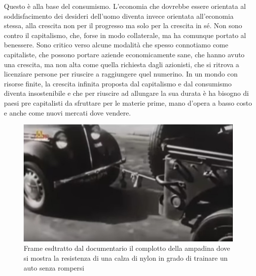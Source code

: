 \documentclass[12pt]{book} %
\begin{document}
Questo è alla base del consumismo. L'economia che dovrebbe essere orientata al soddisfacimento dei
desideri dell'uomo diventa invece orientata all'economia stessa, alla
crescita non per il progresso ma solo per la crescita in sé. Non sono contro il capitalismo, che, forse in modo collaterale, ma ha comunque portato al benessere. Sono critico verso alcune modalità che spesso connotiamo come capitaliste, che possono portare aziende economicamente sane, che hanno avuto una crescita, ma non alta come quella richiesta dagli azionisti, che si ritrova a licenziare persone per riuscire a raggiungere quel numerino. In un mondo con risorse finite, la crescita infinita proposta dal capitalismo e dal consumismo diventa insostenibile e che per riuscire ad allungare la sua durata è ha bisogno di paesi pre capitalisti da sfruttare per le materie prime, mano d'opera a basso costo e anche come nuovi mercati dove vendere.

\needspace{4cm}
\begin{figure}
  \centering
  \includegraphics[width=0.95\linewidth]{images/Libro-img052.jpg}
  \begin{minipage}{\linewidth}
    \caption{Frame esdtratto dal documentario {\textquotedbl}il
complotto della ampadina{\textquotedbl} dove si mostra la resistenza di una calza di nylon in grado di trainare un auto
senza rompersi}
  \end{minipage}
\end{figure}
\end{document}
